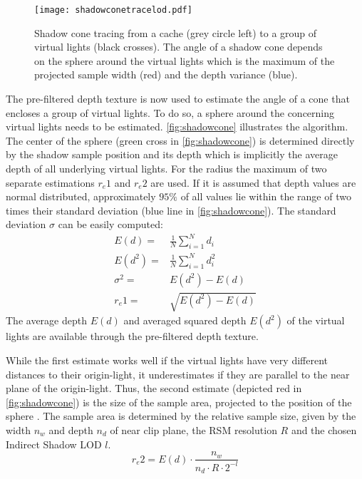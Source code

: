 \documentclass[thesis.tex]{subfiles}
\begin{document}
\begin{figure}[h]
	\centering
	\texttt{[image: shadowconetracelod.pdf]}
	\caption{Shadow cone tracing from a cache (grey circle left) to a group of virtual lights (black crosses). The angle of a shadow cone depends on the sphere around the virtual lights which is the maximum of the projected sample width (red) and the depth variance (blue).} \label{fig:shadowcone}
\end{figure}
The pre-filtered depth texture is now used to estimate the angle of a cone that encloses a group of virtual lights. 
To do so, a sphere around the concerning virtual lights needs to be estimated.
\autoref{fig:shadowcone} illustrates the algorithm.
The center of the sphere (green cross in \autoref{fig:shadowcone}) is determined directly by the shadow sample position and its depth which is implicitly the average depth of all underlying virtual lights.
For the radius the maximum of two separate estimations $r_e1$ and $r_e2$ are used.
If it is assumed that depth values are normal distributed, approximately $95\%$ of all values lie within the range of two times their standard deviation (blue line in \autoref{fig:shadowcone}).
The standard deviation $\sigma$ can be easily computed:
\begin{align}
E(d) =& \frac{1}{N} \sum\limits_{i=1}^{N} d_i\\
E(d^2) =& \frac{1}{N} \sum\limits_{i=1}^{N} d_i^2\\
\sigma^2 =& E(d^2) - E(d)\\
r_e1 =& \sqrt{E(d^2) - E(d)}
\end{align}
The average depth $E(d)$ and averaged squared depth $E(d^2)$ of the virtual lights are available through the pre-filtered depth texture.

While the first estimate works well if the virtual lights have very different distances to their origin-light, it underestimates if they are parallel to the near plane of the origin-light.
Thus, the second estimate (depicted red in \autoref{fig:shadowcone}) is the size of the sample area, projected to the position of the sphere .
The sample area is determined by the relative sample size, given by the width $n_w$ and depth $n_d$ of near clip plane, the RSM resolution $R$ and the chosen Indirect Shadow LOD $l$. 
\begin{equation}
r_e2 = E(d) \cdot \frac{n_w}{n_d \cdot R \cdot 2^{-l} }
\end{equation}
\end{document}

